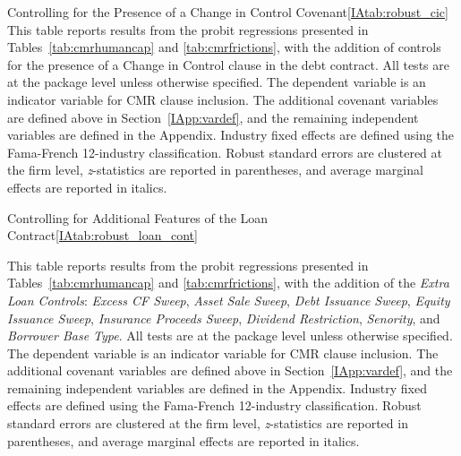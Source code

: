 \documentclass[12pt]{article}
\begin{document}
\begin{appendices}
\begin{singlespace}
\begin{papertable}{Controlling for the Presence of a Change in Control Covenant}{\ref{IAtab:robust_cic}}{}
  This table reports results from the probit regressions presented in Tables~\ref{tab:cmrhumancap} and \ref{tab:cmrfrictions}, with the addition of controls for the presence of a Change in Control clause in the debt contract.
  All tests are at the package level unless otherwise specified.
  The dependent variable is an indicator variable for CMR clause inclusion.
  The additional covenant variables are defined above in Section~\ref{IApp:vardef}, and the remaining independent variables are defined in the Appendix.
  Industry fixed effects are defined using the Fama-French 12-industry classification.
  Robust standard errors are clustered at the firm level, \textit{z}-statistics are reported in parentheses, and average marginal effects are reported in italics.
  \postamblesig

  \startdata
  
\end{papertable}





\begin{papertable}{Controlling for Additional Features of the Loan Contract}{\ref{IAtab:robust_loan_cont}}{}
  \label{IAtab:robust_loan_cont}

  This table reports results from the probit regressions presented in Tables~\ref{tab:cmrhumancap} and \ref{tab:cmrfrictions}, with the addition of the \textit{Extra Loan Controls}: \textit{Excess CF Sweep}, \textit{Asset Sale Sweep}, \textit{Debt Issuance Sweep}, \textit{Equity Issuance Sweep}, \textit{Insurance Proceeds Sweep}, \textit{Dividend Restriction}, \textit{Senority}, and \textit{Borrower Base Type}.
  All tests are at the package level unless otherwise specified.
  The dependent variable is an indicator variable for CMR clause inclusion.
  The additional covenant variables are defined above in Section~\ref{IApp:vardef}, and the remaining independent variables are defined in the Appendix.
  Industry fixed effects are defined using the Fama-French 12-industry classification.
  Robust standard errors are clustered at the firm level, \textit{z}-statistics are reported in parentheses, and average marginal effects are reported in italics.
  \postamblesig

  \startdata
  
\end{papertable}






\end{singlespace}
\end{appendices}
\end{document}
